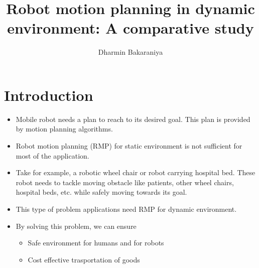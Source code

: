 \documentclass[rnd]{mas_proposal}
\title{Robot motion planning in dynamic environment: A comparative study}
\author{Dharmin Bakaraniya}
\begin{document}
\maketitle

\pagestyle{plain}

\chapter{Introduction}
\begin{itemize}
    \item Mobile robot needs a plan to reach to its desired goal. This plan is provided by motion planning algorithms.
    \item Robot motion planning (RMP) for static environment is not sufficient for most of the application.
    \item Take for example, a robotic wheel chair or robot carrying hospital bed. These robot needs to tackle moving obstacle like patients, other wheel chairs, hospital beds, etc. while safely moving towards its goal.
    \item This type of problem applications need RMP for dynamic environment. 
    \item By solving this problem, we can ensure 
        \begin{itemize}
            \item Safe environment for humans and for robots
            \item Cost effective trasportation of goods
        \end{itemize}
\end{itemize}
\end{document}
